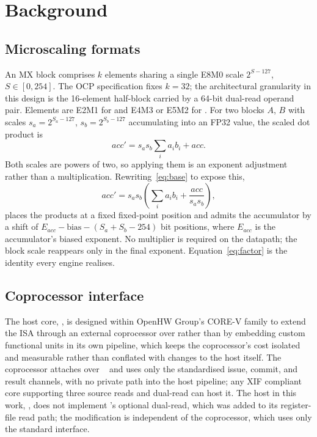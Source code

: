 \section{Background}
\label{sec:background}

\subsection{Microscaling formats}
\label{sec:bg-mx}

An MX block comprises $k$ elements sharing a single E8M0 scale
$2^{S-127}$, $S \in [0,254]$. The OCP specification fixes $k=32$; the
architectural granularity in this design is the 16-element half-block carried
by a 64-bit dual-read operand pair. Elements are E2M1 for \fpfour{} and E4M3 or
E5M2 for \fpeight. For two blocks $A$, $B$ with scales $s_a=2^{S_a-127}$,
$s_b=2^{S_b-127}$ accumulating into an FP32 value, the scaled dot product is
%
\begin{equation}
  \label{eq:base}
  \mathit{acc}' = s_a s_b \sum_i a_i b_i + \mathit{acc}.
\end{equation}
%
Both scales are powers of two, so applying them is an exponent adjustment
rather than a multiplication. Rewriting~\eqref{eq:base} to expose this,
%
\begin{equation}
  \label{eq:factor}
  \mathit{acc}' = s_a s_b\!\left( \sum_i a_i b_i
                  + \frac{\mathit{acc}}{s_a s_b} \right),
\end{equation}
%
places the products at a fixed fixed-point position and admits the accumulator
by a shift of $E_{\mathit{acc}} - \mathrm{bias} - (S_a{+}S_b{-}254)$ bit
positions, where $E_{\mathit{acc}}$ is the accumulator's biased exponent. No
multiplier is required on the datapath; the block scale reappears only in the
final exponent. Equation~\eqref{eq:factor} is the identity every engine
realises.

\subsection{Coprocessor interface}
\label{sec:bg-xif}

The host core, \core, is designed within OpenHW Group's CORE-V family to
extend the ISA through an external coprocessor over \xif{} rather than by
embedding custom functional units in its own pipeline, which keeps the
coprocessor's cost isolated and measurable rather than conflated with changes
to the host itself. The coprocessor attaches over \xif~\cite{openhw_cvxif} and
uses only the standardised issue, commit, and result channels, with no private
path into the host pipeline; any XIF compliant core supporting three source
reads and dual-read can host it. The host in this work, \core, does not
implement \xif's optional dual-read, which was added to its register-file read
path; the modification is independent of the coprocessor, which uses only the
standard interface.

